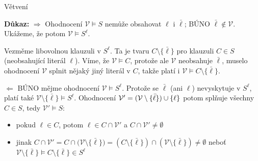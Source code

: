 \documentclass{beamer}
\begin{document}
\begin{frame}{Větvení}
    

    \textbf{Důkaz:} \alert{$\Rightarrow$} Ohodnocení $\mathcal V\models S$ nemůže obsahovat $\ell$ i $\bar\ell$; BÚNO \alert{$\bar\ell\notin\mathcal V$}. Ukážeme, že potom $\mathcal V\models S^\ell$. 
    
    Vezměme libovolnou klauzuli v $S^\ell$. Ta je tvaru $C\setminus\{\bar\ell\}$ pro klauzuli $C\in S$ (neobsahující literál $\ell$). Víme, že $\mathcal V\models C$, protože ale $\mathcal V$ neobsahuje $\bar\ell$, muselo ohodnocení $\mathcal V$ splnit nějaký jiný literál v $C$, takže platí i $\mathcal V\models C\setminus\{\bar\ell\}$.

    \alert{$\Leftarrow$} BÚNO mějme ohodnocení \alert{$\mathcal V\models S^\ell$}. Protože se $\bar\ell$ (ani $\ell$) nevyskytuje v $S^\ell$, platí také \alert{$\mathcal V\setminus\{\bar\ell\}\models S^\ell$}. Ohodnocení \alert{$\mathcal V'=(\mathcal V\setminus\{\bar\ell\})\mathbin{\cup}\{\ell\}$} potom splňuje všechny $C\in S$, tedy $\mathcal V'\models S$: 
    \begin{itemize}
        \item pokud $\ell\in C$, potom $\ell\in C\cap\mathcal V'$ a $C\cap\mathcal V'\neq\emptyset$
        \item jinak $C\cap\mathcal V'=C\cap\mathcal (\mathcal V\setminus\{\bar\ell\})=(C\setminus\{\bar\ell\})\cap(\mathcal V\setminus\{\bar\ell\})\neq\emptyset$ neboť $\mathcal V\setminus\{\bar\ell\}\models C\setminus\{\bar\ell\}\in S^\ell$\hfill\qedsymbol
    \end{itemize}

\end{frame}
\end{document}
